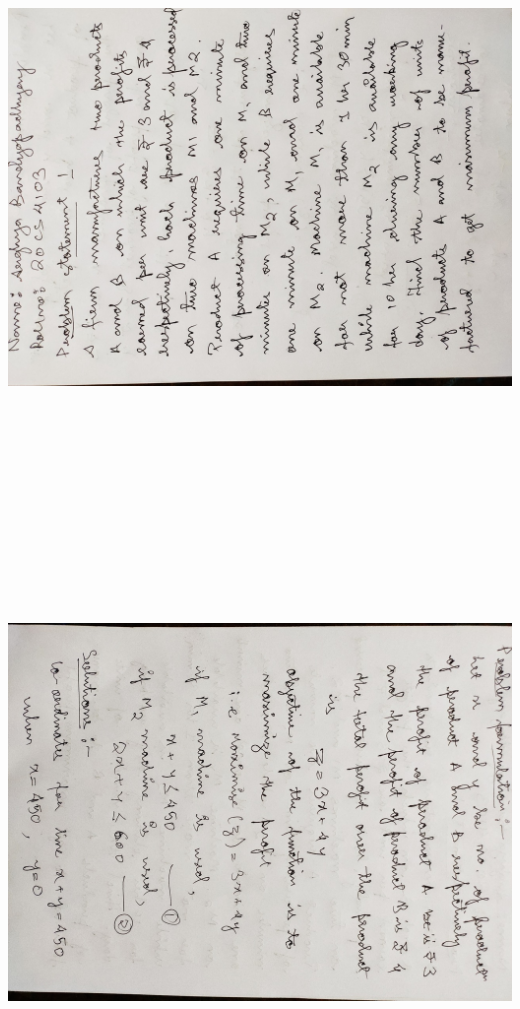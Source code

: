 \documentclass[12pt, letterpaper, twoside]{book}
\begin{document}
\begin{flushleft}
\includegraphics[width=\paperheight, height=8.49in, angle=270]{Page1}
\end{flushleft}
\includegraphics[width=\paperheight, height=\paperwidth, angle=90]{Page2}
\end{document}
